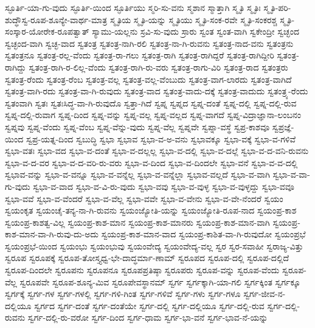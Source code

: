 {ಸ್ಫೂರ್ತಿ-ಯಾ-ಗು-ವುದು
ಸ್ಫೂರ್ತಿ-ಯಿಂದ
ಸ್ಫೂರ್ತಿಯು
ಸ್ಮರಿ-ಸು-ವನು
ಸ್ಮಶಾನ
ಸ್ಮಾತ್ತಾಗಿ
ಸ್ಮೃತಿ
ಸ್ಮೃತಿಃ
ಸ್ಮೃತಿ-ಪರಿ-ಶುದ್ಧೌಸ್ವ-ರೂಪ-ಶೂನ್ಯೇ-ವಾರ್ಥ-ಮಾತ್ರ
ಸ್ಮೃತಿಯ
ಸ್ಮೃತಿ-ಯನ್ನು
ಸ್ಮೃತಿಯು
ಸ್ಮೃತಿ-ಸಂಕ-ರವೇ
ಸ್ಮೃತಿ-ಸಂಕರಶ್ಚ
ಸ್ಮೃತಿ-ಸಂಸ್ಕಾರ-ಯೋರೇಕ-ರೂಪತ್ವಾತ್
ಸ್ಯಾಮು-ಯಲ್ಲನು
ಸ್ರವಿ-ಸು-ವುದು
ಸ್ರಾರು
ಸ್ವಂತ
ಸ್ವಂತ-ವಾಗಿ
ಸ್ವಕೇಂದ್ರೀ
ಸ್ವಚ್ಛಂದ
ಸ್ವಚ್ಛಂದ-ವಾಗಿ
ಸ್ವಚ್ಛ-ವಾದ
ಸ್ವತಂತ್ರ
ಸ್ವತಂತ್ರ-ನಾಗಿ-ರಲಿ
ಸ್ವತಂತ್ರ-ನಾ-ಗಿ-ರುವನು
ಸ್ವತಂತ್ರ-ನಾದ-ವನು
ಸ್ವತಂತ್ರನು
ಸ್ವತಂತ್ರನೂ
ಸ್ವತಂತ್ರ-ರಲ್ಲ-ವೆಂದು
ಸ್ವತಂತ್ರ-ರಾ-ಗಲು
ಸ್ವತಂತ್ರ-ರಾಗಿ
ಸ್ವತಂತ್ರ-ರಾಗಿದ್ದರೆ
ಸ್ವತಂತ್ರ-ರಾಗಿದ್ದೀರಿ
ಸ್ವತಂತ್ರ-ರಾಗಿದ್ದು
ಸ್ವತಂತ್ರ-ರಾಗಿ-ರ-ಲಿಲ್ಲ-ವೆಂದು
ಸ್ವತಂತ್ರ-ರಾಗಿ-ರು-ವರು
ಸ್ವತಂತ್ರ-ರಾಗು-ವಿರಿ
ಸ್ವತಂತ್ರ-ರಾದ
ಸ್ವತಂತ್ರರು
ಸ್ವತಂತ್ರ-ರೆಂದು
ಸ್ವತಂತ್ರ-ರೆಂಬ
ಸ್ವತಂತ್ರ-ವಲ್ಲ
ಸ್ವತಂತ್ರ-ವಲ್ಲ-ವೆಂಬುದು
ಸ್ವತಂತ್ರ-ವಾಗ-ಲಾರದು
ಸ್ವತಂತ್ರ-ವಾಗಿದೆ
ಸ್ವತಂತ್ರ-ವಾಗಿ-ರದು
ಸ್ವತಂತ್ರ-ವಾ-ಗಿ-ರುವುದು
ಸ್ವತಂತ್ರ-ವಾದ
ಸ್ವತಂತ್ರ-ವಾದು-ದಕ್ಕೆ
ಸ್ವತಂತ್ರ-ವಾದುದು
ಸ್ವತಂತ್ರ್ಯ-ರೆಂದು
ಸ್ವತಂವಾಗಿ
ಸ್ವತಃ
ಸ್ವತಃಸಿದ್ಧ-ವಾ-ಗಿ-ರುವುದೊ
ಸ್ವತ್ತಾ-ಗಿದೆ
ಸ್ವಪ್ನ
ಸ್ವಪ್ನದ
ಸ್ವಪ್ನ-ದಂತೆ
ಸ್ವಪ್ನ-ದಲ್ಲಿ
ಸ್ವಪ್ನ-ದಲ್ಲಿ-ರುವ
ಸ್ವಪ್ನ-ದಲ್ಲಿ-ರುವಾಗ
ಸ್ವಪ್ನ-ದಿಂದ
ಸ್ವಪ್ನ-ವನ್ನು
ಸ್ವಪ್ನ-ವಲ್ಲ
ಸ್ವಪ್ನ-ವಲ್ಲದ
ಸ್ವಪ್ನ-ವಾಗದೆ
ಸ್ವಪ್ನ-ವಿದ್ರಾಜ್ಞಾನಾ-ಲಂಬನಂ
ಸ್ವಪ್ನವು
ಸ್ವಪ್ನ-ವೆಂದು
ಸ್ವಪ್ನ-ವೆಂಬ
ಸ್ವಪ್ನ-ವೆನ್ನು-ವುದು
ಸ್ವಪ್ನ-ವೆಲ್ಲ
ಸ್ವಪ್ನವೇ
ಸ್ವಪ್ನಾ-ವಸ್ಥೆ
ಸ್ವಪ್ರ-ಕಾಶವೂ
ಸ್ವಪ್ರಜ್ಞೆ-ಯಿಂದ
ಸ್ವಪ್ರ-ಯತ್ನ-ದಿಂದ
ಸ್ವಬುದ್ಧಿ
ಸ್ವಭಾ
ಸ್ವಭಾವ
ಸ್ವಭಾ-ವ-ಅ-ವನು
ಸ್ವಭಾವಕ್ಕೂ
ಸ್ವಭಾ-ವಕ್ಕೆ
ಸ್ವಭಾ-ವ-ಗಳಿವೆ
ಸ್ವಭಾ-ವತಃ
ಸ್ವಭಾ-ವದ
ಸ್ವಭಾ-ವ-ದಂತೆ
ಸ್ವಭಾ-ವ-ದಲ್ಲಲ್ಲ
ಸ್ವಭಾ-ವ-ದಲ್ಲಿ
ಸ್ವಭಾ-ವ-ದಲ್ಲೆ
ಸ್ವಭಾ-ವ-ದ-ವನಿ-ರುವನು
ಸ್ವಭಾ-ವ-ದ-ವರ
ಸ್ವಭಾ-ವ-ದ-ವರಿ-ರು-ವರು
ಸ್ವಭಾ-ವ-ದಿಂದ
ಸ್ವಭಾ-ವ-ದಿಂದಲೇ
ಸ್ವಭಾ-ವನೆ
ಸ್ವಭಾ-ವ-ವ-ದಲ್ಲಿ
ಸ್ವಭಾವ-ವನ್ನು
ಸ್ವಭಾ-ವ-ವನ್ನೂ
ಸ್ವಭಾ-ವ-ವನ್ನೆಲ್ಲ
ಸ್ವಭಾ-ವ-ವನ್ನೆಲ್ಲಾ
ಸ್ವಭಾವ-ವಲ್ಲದೆ
ಸ್ವಭಾ-ವ-ವಾಗಿ
ಸ್ವಭಾ-ವ-ವಾ-ಗು-ವುದು
ಸ್ವಭಾ-ವ-ವಾದ
ಸ್ವಭಾ-ವ-ವಿ-ರು-ವುದು
ಸ್ವಭಾ-ವವು
ಸ್ವಭಾ-ವ-ವುಳ್ಳ
ಸ್ವಭಾ-ವ-ವುಳ್ಳದ್ದು
ಸ್ವಭಾ-ವವೂ
ಸ್ವಭಾ-ವವೆ
ಸ್ವಭಾ-ವ-ವೆಂದರೆ
ಸ್ವಭಾ-ವ-ವೆಲ್ಲ
ಸ್ವಭಾ-ವವೇ
ಸ್ವಭಾ-ವ-ವೇನು
ಸ್ವಭಾ-ವ-ವೇ-ನೆಂದರೆ
ಸ್ವಯಂ
ಸ್ವಯಂಕೃತ
ಸ್ವಯಂಚೈ-ತನ್ಯ-ನಾ-ಗಿ-ರುವನು
ಸ್ವಯಂಜ್ಯೋತಿ-ಯನ್ನು
ಸ್ವಯಂಜ್ಯೋತಿ-ರೂಪ-ನಾದ
ಸ್ವಯಂಪ್ರ-ಕಾಶ
ಸ್ವಯಂಪ್ರ-ಕಾಶತ್ವ-ವಿಲ್ಲ
ಸ್ವಯಂಪ್ರ-ಕಾಶ-ಮಾನ
ಸ್ವಯಂಪ್ರ-ಕಾಶ-ಮಾನರು
ಸ್ವಯಂಪ್ರ-ಕಾಶ-ಮಾನ-ವಾಗಿ
ಸ್ವಯಂಪ್ರ-ಕಾಶ-ಮಾನ-ವಾ-ಗಿ-ರುವು-ದು-ಅದು
ಸ್ವಯಂಪ್ರ-ಕಾಶ-ಮಾನ-ವಾದ
ಸ್ವಯಂಪ್ರ-ಕಾಶಿತ-ವಾ-ಗಿ-ರುವುದೋ
ಸ್ವಯಂಪ್ರಭೆ
ಸ್ವಯಂಪ್ರಭೆ-ಯಿಂದ
ಸ್ವಯಂಭು
ಸ್ವಯಂಭುವು
ಸ್ವಯಂವೇದ್ಯ
ಸ್ವಯಂವೇದ್ಯ-ವಲ್ಲ
ಸ್ವರ
ಸ್ವರ-ಸವಾಹೀ
ಸ್ವರಾಜ್ಯ-ವಿತ್ತು
ಸ್ವರೂಪ
ಸ್ವರೂಪಕ್ಕೆ
ಸ್ವರೂಪ-ತೋಸ್ತ್ಯಧ್ವ-ಭೇ-ದಾದ್ಧರ್ಮಾ-ಣಾಮ್
ಸ್ವರೂಪದ
ಸ್ವರೂಪ-ದಲ್ಲಿ
ಸ್ವರೂಪ-ದಲ್ಲಿದೆ
ಸ್ವರೂಪ-ದಿಂದಲೇ
ಸ್ವರೂಪನು
ಸ್ವರೂಪನೂ
ಸ್ವರೂಪಪ್ರತಿಷ್ಠಾ
ಸ್ವರೂಪರು
ಸ್ವರೂಪ-ವನ್ನು
ಸ್ವರೂಪ-ವೆಂದು
ಸ್ವರೂಪ-ವೆಲ್ಲ
ಸ್ವರೂಪವೇ
ಸ್ವರೂಪ-ಶೂನ್ಯ-ಮಿವ
ಸ್ವರೂಪೇವಸ್ಥಾನಮ್
ಸ್ವರ್ಗ
ಸ್ವರ್ಗಕ್ಕಾಗಿ-ಯಾ-ಗಲಿ
ಸ್ವರ್ಗಕ್ಕಿಂತ
ಸ್ವರ್ಗಕ್ಕೂ
ಸ್ವರ್ಗಕ್ಕೆ
ಸ್ವರ್ಗ-ಗಳ
ಸ್ವರ್ಗ-ಗಳಲ್ಲಿ
ಸ್ವರ್ಗ-ಗಳಿ-ಗಿಂತ
ಸ್ವರ್ಗ-ಗಳಿವೆ
ಸ್ವರ್ಗ-ಗಳು
ಸ್ವರ್ಗ-ಗಳೂ
ಸ್ವರ್ಗ-ಜೀವ-ನ-ದಲ್ಲಿಯೂ
ಸ್ವರ್ಗದ
ಸ್ವರ್ಗ-ದಂತೆ
ಸ್ವರ್ಗ-ದಂತೆಯೇ
ಸ್ವರ್ಗ-ದಲ್ಲಿ
ಸ್ವರ್ಗ-ದಲ್ಲಿಯೂ
ಸ್ವರ್ಗ-ದಲ್ಲಿ-ರುವ
ಸ್ವರ್ಗ-ದಲ್ಲಿ-ರುವನು
ಸ್ವರ್ಗ-ದಲ್ಲಿ-ರು-ವರೋ
ಸ್ವರ್ಗ-ದಿಂದ
ಸ್ವರ್ಗ-ಧಾಮ
ಸ್ವರ್ಗ-ಭಾ-ವನೆ
ಸ್ವರ್ಗ-ಭಾವ-ನೆ-ಯನ್ನು
}

